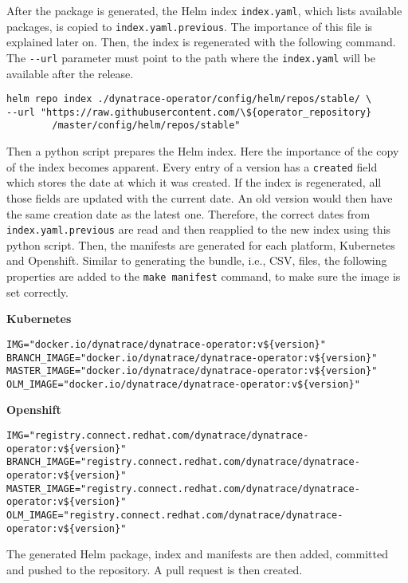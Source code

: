 After the package is generated, the Helm index \verb|index.yaml|, which lists available packages, is copied to \verb|index.yaml.previous|.
The importance of this file is explained later on.
Then, the index is regenerated with the following command.
The \verb|--url| parameter must point to the path where the \verb|index.yaml| will be available after the release.

\begin{verbatim}
helm repo index ./dynatrace-operator/config/helm/repos/stable/ \
--url "https://raw.githubusercontent.com/\${operator_repository}
        /master/config/helm/repos/stable"
\end{verbatim}

Then a python script prepares the Helm index.
Here the importance of the copy of the index becomes apparent.
Every entry of a version has a \verb|created| field which stores the date at which it was created.
If the index is regenerated, all those fields are updated with the current date.
An old version would then have the same creation date as the latest one.
Therefore, the correct dates from \verb|index.yaml.previous| are read and then reapplied to the new index using this python script.
Then, the manifests are generated for each platform, Kubernetes and Openshift.
Similar to generating the bundle, i.e., CSV, files, the following properties are added to the \verb|make manifest| command, to make sure the image is set correctly.

\textbf{Kubernetes}

\begin{verbatim}
IMG="docker.io/dynatrace/dynatrace-operator:v${version}"
BRANCH_IMAGE="docker.io/dynatrace/dynatrace-operator:v${version}"
MASTER_IMAGE="docker.io/dynatrace/dynatrace-operator:v${version}"
OLM_IMAGE="docker.io/dynatrace/dynatrace-operator:v${version}"
\end{verbatim}

\textbf{Openshift}

\begin{verbatim}
IMG="registry.connect.redhat.com/dynatrace/dynatrace-operator:v${version}"
BRANCH_IMAGE="registry.connect.redhat.com/dynatrace/dynatrace-operator:v${version}"
MASTER_IMAGE="registry.connect.redhat.com/dynatrace/dynatrace-operator:v${version}"
OLM_IMAGE="registry.connect.redhat.com/dynatrace/dynatrace-operator:v${version}"
\end{verbatim}

The generated Helm package, index and manifests are then added, committed and pushed to the repository.
A pull request is then created.

